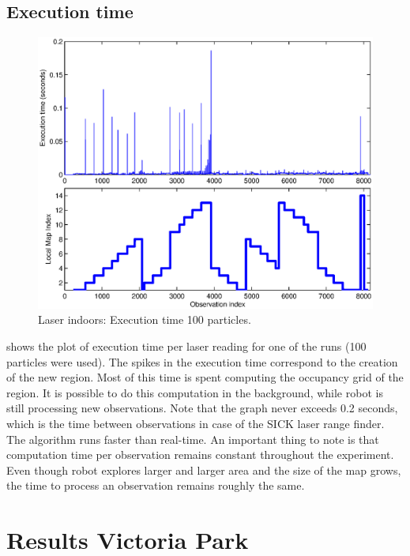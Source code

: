 \subsection{Execution time}


\begin{figure}[htbp]
  \centering
  \includegraphics[width=15cm]{Pics/corners_execution_time}
  
  \caption{Laser indoors: Execution time 100 particles.}
  \label{fig:corners_execution_time}
\end{figure}

 shows the plot of execution time
per laser reading for one of the runs (100 particles were used).  The
spikes in the execution time correspond to the creation of the new
region. Most of this time is spent computing the occupancy grid of the
region. It is possible to do this computation in the background, while
robot is still processing new observations. Note that the graph never
exceeds 0.2 seconds, which is the time between observations in case of
the SICK laser range finder. The algorithm runs faster than
real-time. An important thing to note is that computation time per
observation remains constant throughout the experiment. Even though
robot explores larger and larger area and the size of the map grows, the
time to process an observation remains roughly the same.


\section {Results Victoria Park}

